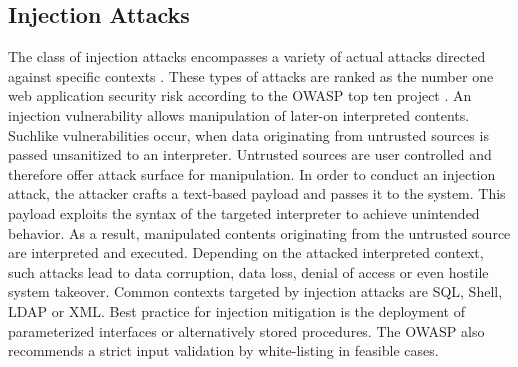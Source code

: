 \subsection{Injection Attacks}
The class of injection attacks encompasses a variety of actual attacks directed against specific contexts \cite{OWASP:2013}. These types of attacks are ranked as the number one web application security risk according to the OWASP top ten project \cite{OWASP:2013b}. An injection vulnerability allows manipulation of later-on interpreted contents. Suchlike vulnerabilities occur, when data originating from untrusted sources is passed unsanitized to an interpreter. Untrusted sources are user controlled and therefore offer attack surface for manipulation. In order to conduct an injection attack, the attacker crafts a text-based payload and passes it to the system. This payload exploits the syntax of the targeted interpreter to achieve unintended behavior. As a result, manipulated contents originating from the untrusted source are interpreted and executed. Depending on the attacked interpreted context, such attacks lead to data corruption, data loss, denial of access or even hostile system takeover. Common contexts targeted by injection attacks are SQL, Shell, LDAP or XML. Best practice for injection mitigation is the deployment of parameterized interfaces or alternatively stored procedures. The OWASP also recommends a strict input validation by white-listing in feasible cases.
